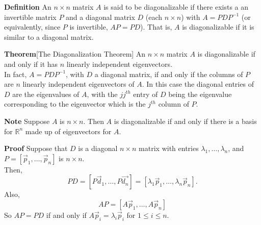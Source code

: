  \begin{frame}[fragile]
\textbf{Definition}
An $n \times n$ matrix $A$ is said to be diagonalizable if there exists a 
an invertible matrix $P$ and a diagonal matrix $D$ (each $n\times n$) with
$A=PDP^{-1}$ (or equivalently, since $P$ is invertible, $AP=PD$).  That is, $A$ is diagonalizable if it
is similar to a diagonal matrix.
 
\textbf{Theorem}[The Diagonalization Theorem]
An $n\times n$ matrix $A$ is diagonalizable if and only if it has $n$ linearly independent
eigenvectors. \\ 
In fact, $A=PDP^{-1}$, with $D$ a diagonal matrix, if and only if the 
columns of $P$ are $n$ linearly independent eigenvectors of $A$.  In this case the 
diagonal entries of $D$ are the eigenvalues of $A$, with the $jj^{th}$ entry of $D$ being
the eigenvalue corresponding to the eigenvector which is the $j^{th}$ column of $P$.


\end{frame}





 \begin{frame}[fragile]

\textbf{Note}
 Suppose $A$ is $n\times n$.  Then $A$ is diagonalizable if and only if there is a basis for $\mathbb R^n$ made up of eigenvectors for $A$.
 

\textbf{Proof}
Suppose that $D$ is a diagonal $n\times n$ matrix with entries $\lambda_1, \dots, \lambda_n$, and $P=[\vec{p}_1,\dots,\vec{p}_n]$ is $n\times n$.  \\ 
Then,
\[
PD= [P\vec{d}_1,\dots, P\vec{d_n}] =  \left[\lambda_{1}\vec{p}_1, \dots, \lambda_{n} \vec{p}_n \right].
\]  
Also,
\[
AP = [A\vec{p}_1,\dots, A\vec{p}_n]
\]  
So $AP=PD$ if and only if $A\vec{p}_i=\lambda_i\vec{p}_i$ for $1\le i\le n$. 

\end{frame}





